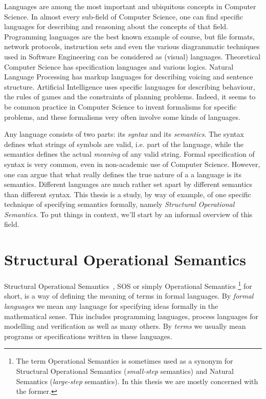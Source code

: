 Languages are among the most important and ubiquitous concepts in Computer Science.
In almost every sub-field of Computer Science, one can find specific languages for
describing and reasoning about the concepts of that field. Programming languages
are the best known example of course, but file formats, network protocols,
instruction sets and even the various diagrammatic techniques used in Software
Engineering can be considered as (visual) languages. Theoretical Computer Science has
specification languages and various logics. Natural Language Processing has markup
languages for describing voicing and sentence structure. Artificial Intelligence
uses specific languages for describing behaviour, the rules of games and the
constraints of planning problems. Indeed, it seems to be common practice in 
Computer Science to invent formalisms for specific problems, and these formalisms
very often involve some kinds of languages.

Any language consists of two parts: its \emph{syntax} and its \emph{semantics}.
The syntax defines what strings of symbols are valid, i.e. part of the language,
while the semantics defines the actual \emph{meaning} of any valid string.
Formal specification of syntax is very common, even in non-academic use of 
Computer Science. However, one can argue that what really 
defines the true nature
of a a language
is its semantics. Different languages are much rather set apart by different
semantics than different syntax.
This thesis is a study, by way of example, of one specific technique of specifying
semantics formally, namely \emph{Structural Operational Semantics}. To put things
in context, we'll start by an informal overview of this field.


\section{Structural Operational Semantics} %
\label{sec:intro_sos}

Structural Operational Semantics~\cite{Plotkin04a, Plotkin04b},
SOS or simply Operational Semantics
\footnote{The term Operational Semantics is sometimes used as a synonym for
Structural Operational Semantics (\emph{small-step} semantics) and Natural
Semantics (\emph{large-step} semantics). In this thesis we are mostly
concerned with the former.}
for short,
is a way of defining the meaning of terms in formal languages. By
\emph{formal languages} we mean any language for specifying ideas formally in the mathematical
sense. This includes programming languages, process languages for modelling and
verification as well as many others. By \emph{terms} we usually mean programs
or specifications written in these languages.

